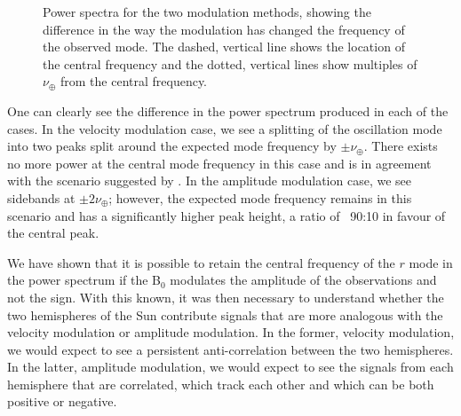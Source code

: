 \begin{figure}[!ht]
	\centering
	\qquad
	\caption{Power spectra for the two modulation methods, showing the difference in the way the modulation has changed the frequency of the observed mode. The dashed, vertical line shows the location of the central frequency and the dotted, vertical lines show multiples of $\nu_{\oplus}$ from the central frequency.}  \label{fig:modulation_PSDs}
\end{figure}

One can clearly see the difference in the power spectrum produced in each of the cases. In the velocity modulation case, we see a splitting of the oscillation mode into two peaks split around the expected mode frequency by $\pm \nu_{\oplus}$. There exists no more power at the central mode frequency in this case and is in agreement with the scenario suggested by \citet{lanza_sectoral_2019}. In the amplitude modulation case, we see sidebands at $\pm 2\nu_{\oplus}$; however, the expected mode frequency remains in this scenario and has a significantly higher peak height, a ratio of ~90:10 in favour of the central peak.

We have shown that it is possible to retain the central frequency of the $r$ mode in the power spectrum  if the B$_0$ modulates the amplitude of the observations and not the sign. With this known, it was then necessary to understand whether the two hemispheres of the Sun contribute signals that are more analogous with the velocity modulation or amplitude modulation. In the former, velocity modulation, we would expect to see a persistent anti-correlation between the two hemispheres. In the latter, amplitude modulation, we would expect to see the signals from each hemisphere that are correlated, which track each other and which can be both positive or negative.

